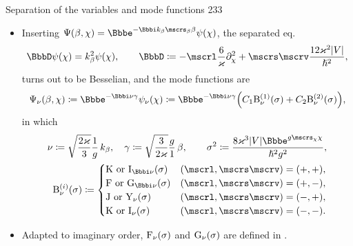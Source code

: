 \documentclass[9pt]{beamer}
\begin{document}
\begin{frame}%
{Separation of the variables and mode functions}%
{233}
\begin{itemize}
\item
Inserting %
$\rfun{\Psi}{\beta,\chi} = \ee^{-\ii k_\beta\mscrs_\beta\beta} 
\rfun{\psi}{\chi}$, the separated eq.\
\begin{align}
\BbbD \rfun{\psi}{\chi} = k_\beta^2 \rfun{\psi}{\chi},\qquad
\BbbD \coloneqq
-\mscrl \frac{6}{\varkappa} \partial_\chi^2
+ \mscrs\mscrv \frac{12\varkappa^2\vbr{V}}{\hslash^2},
\label{eq:separated-10}
\end{align}
turns out to be Besselian, and the mode functions are
\begin{align}
\rfun{\Psi_\nu}{\beta, \chi} \coloneqq
\ee^{-\ii \nu \gamma} \rfun{\psi_\nu}{\chi} \coloneqq
\ee^{-\ii \nu \gamma} \rbr{C_1\rfun{\mathrm{B}_{\nu}^{(1)}}{\sigma}
+C_2\rfun{\mathrm{B}_{\nu}^{(2)}}{\sigma}},
\end{align}
in which
\begin{align}
\nu \coloneqq \sqrt{\frac{2\varkappa}{3}}\frac{1}{g}\,k_\beta,\quad
\gamma \coloneqq \sqrt{\frac{3}{2\varkappa}}\frac{g}{1}\,\beta,\qquad
\sigma^2 \coloneqq 
\frac{8\varkappa^3\vbr{V}\ee^{g\mscrs_\chi\chi}}{\hslash^2 g^2},\\
\label{eq:trsf-quantum-sigma}
\rfun{\mathrm{B}^{(i)}_{\nu}}{\sigma} \coloneqq
\begin{cases}
\mathrm{K}\text{ or }\rfun{\mathrm{I}_{\ii\nu}}{\sigma}
& \rbr{\mscrl, \mscrs\mscrv} = \rbr{+,+}, \\
\mathrm{F}\text{ or }\rfun{\mathrm{G}_{\ii\nu}}{\sigma}
& \rbr{\mscrl, \mscrs\mscrv} = \rbr{+,-}, \\
\mathrm{J}\text{ or }\rfun{\mathrm{Y}_{\nu}}{\sigma}
& \rbr{\mscrl, \mscrs\mscrv} = \rbr{-,+}, \\
\mathrm{K}\text{ or }\rfun{\mathrm{I}_{\nu}}{\sigma}
& \rbr{\mscrl, \mscrs\mscrv} = \rbr{-,-}. \\
\end{cases}
\end{align}
\item Adapted to imaginary order, ${\mathrm{F}_{\nu}}\mathopen{}\left(\sigma\right)\mathclose{}$ and
${\mathrm{G}_{\nu}}\mathopen{}\left(\sigma\right)\mathclose{}$ are defined in .
\end{itemize}
\end{frame}
\end{document}
